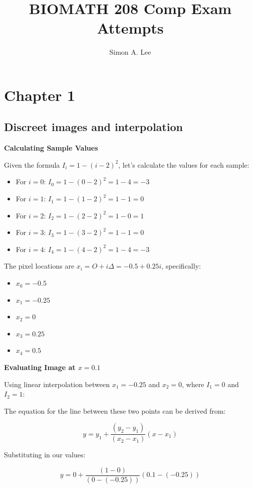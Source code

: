 \documentclass{article}
\title{BIOMATH 208 Comp Exam Attempts}
\author{Simon A. Lee}
\date{}
\begin{document}
\maketitle

\section{Chapter 1}
\subsection{Discreet images and interpolation}
\textbf{Calculating Sample Values}

Given the formula \( I_i = 1 - (i - 2)^2 \), let's calculate the values for each sample:

\begin{itemize}
    \item For \( i = 0 \): \( I_0 = 1 - (0 - 2)^2 = 1 - 4 = -3 \)
    \item For \( i = 1 \): \( I_1 = 1 - (1 - 2)^2 = 1 - 1 = 0 \)
    \item For \( i = 2 \): \( I_2 = 1 - (2 - 2)^2 = 1 - 0 = 1 \)
    \item For \( i = 3 \): \( I_3 = 1 - (3 - 2)^2 = 1 - 1 = 0 \)
    \item For \( i = 4 \): \( I_4 = 1 - (4 - 2)^2 = 1 - 4 = -3 \)
\end{itemize}

The pixel locations are \( x_i = O + i\Delta = -0.5 + 0.25i \), specifically:
\begin{itemize}
    \item \( x_0 = -0.5 \)
    \item \( x_1 = -0.25 \)
    \item \( x_2 = 0 \)
    \item \( x_3 = 0.25 \)
    \item \( x_4 = 0.5 \)
\end{itemize}

\textbf{Evaluating Image at \( x = 0.1 \)}

Using linear interpolation between \( x_1 = -0.25 \) and \( x_2 = 0 \), where \( I_1 = 0 \) and \( I_2 = 1 \):

The equation for the line between these two points can be derived from:

\[
y = y_1 + \frac{(y_2 - y_1)}{(x_2 - x_1)} (x - x_1)
\]

Substituting in our values:

\[
y = 0 + \frac{(1 - 0)}{(0 - (-0.25))} (0.1 - (-0.25))
\]
\end{document}
